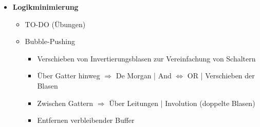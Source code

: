 \begin{itemize}
\item \textbf{Logikminimierung}
	\begin{itemize}
	\item TO-DO (Übungen)
	
	\item Bubble-Pushing
		\begin{itemize}
		
		\item Verschieben von Invertierungsblasen zur Vereinfachung von Schaltern
		\item Über Gatter hinweg $\Rightarrow$ De Morgan | And $\Leftrightarrow$ OR | Verschieben der Blasen
		\item Zwischen Gattern $\Rightarrow$ Über Leitungen | Involution (doppelte Blasen) 
		\item Entfernen verbleibender Buffer
		
		\end{itemize}
	\end{itemize}
	
\end{itemize}

